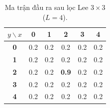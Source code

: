 \begin{table}[!htbp]
\centering
\small
\begin{minipage}[t]{0.42\textwidth}
\centering
\caption{Ma trận đầu vào $5 \times 5$ (tâm $(2,2) = 0.9$).}
\label{tab:input_matrix_5x5}
\begin{tabular}{|c|c|c|c|c|c|}
\hline
$y \backslash x$ & \textbf{0} & \textbf{1} & \textbf{2} & \textbf{3} & \textbf{4} \\ \hline
\textbf{0} & 0.2 & 0.2 & 0.2 & 0.2 & 0.2 \\ \hline
\textbf{1} & 0.2 & 0.2 & 0.2 & 0.2 & 0.2 \\ \hline
\textbf{2} & 0.2 & 0.2 & \textbf{0.9} & 0.2 & 0.2 \\ \hline
\textbf{3} & 0.2 & 0.2 & 0.2 & 0.2 & 0.2 \\ \hline
\textbf{4} & 0.2 & 0.2 & 0.2 & 0.2 & 0.2 \\ \hline
\end{tabular}
\end{minipage}\hfill
\begin{minipage}[t]{0.55\textwidth}
\centering
\caption{Ma trận đầu ra sau lọc Lee $3 \times 3$ ($L=4$).}
\label{tab:output_matrix_5x5}
\end{minipage}
\end{table}

